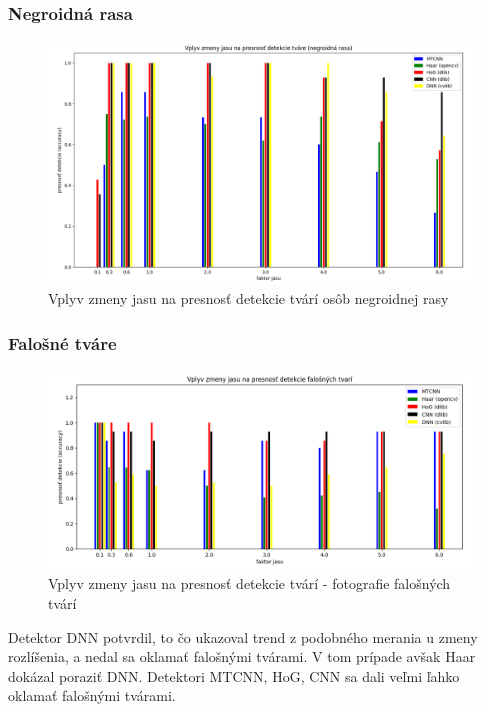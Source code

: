 \documentclass[]{article}
\begin{document}
	\subsubsection*{Negroidná rasa}
	\begin{figure}[h!]
		\includegraphics[width=\textwidth]{Vysledky_jas/negro/Figure_1.png}
		\caption{Vplyv zmeny jasu na presnosť detekcie tvárí osôb negroidnej rasy}
	\end{figure}

	\subsubsection*{Falošné tváre}
	\begin{figure}[h!]
		\includegraphics[width=\textwidth]{Vysledky_jas/fake/Figure_1.png}
		\caption{Vplyv zmeny jasu na presnosť detekcie tvárí - fotografie falošných tvárí}
	\end{figure}

	Detektor DNN potvrdil, to čo ukazoval trend z podobného merania u zmeny rozlíšenia, a nedal sa oklamať falošnými tvárami. V tom prípade avšak Haar dokázal poraziť DNN. Detektori MTCNN, HoG, CNN sa dali veľmi ľahko oklamať falošnými tvárami.
	
\end{document}
